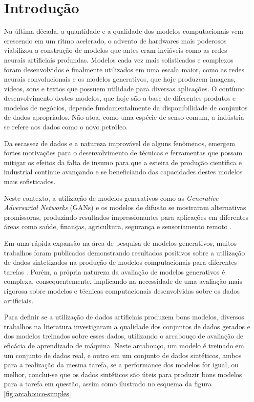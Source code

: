 \chapter{Introdução}
\label{capitulo:introducao}

Na última década, a quantidade e a qualidade dos modelos computacionais vem crescendo em um ritmo acelerado, o advento de hardwares mais poderosos viabilizou a construção de modelos que antes eram inviáveis como as redes neurais artificiais profundas.
Modelos cada vez mais sofisticados e complexos foram desenvolvidos e finalmente utilizados em uma escala maior, como as redes neurais convolucionais e os modelos generativos, que hoje produzem imagens, vídeos, sons e textos que possuem utilidade para diversas aplicações.
O contínuo desenvolvimento destes modelos, que hoje são a base de diferentes produtos e modelos de negócios, depende fundamentalmente da disponibilidade de conjuntos de dados apropriados. Não atoa, como uma espécie de senso comum, a indústria se refere aos dados como o novo petróleo.

Da escassez de dados e a natureza improvável de alguns fenômenos, emergem fortes motivações para o desenvolvimento de técnicas e ferramentas que possam mitigar os efeitos da falta de insumo para que a esteira de produção científica e industrial continue avançando e se beneficiando das capacidades destes modelos mais sofisticados.

Neste contexto, a utilização de modelos generativos como as \textit{Generative Adversarial Networks} (GANs) e os modelos de difusão se mostraram alternativas promissoras, produzindo resultados impressionantes para aplicações em diferentes áreas como saúde, finanças, agricultura, segurança e sensoriamento remoto \cite{iglesiasSurveyGANsComputer2023}.

Em uma rápida expansão na área de pesquisa de modelos generativos, muitos trabalhos foram publicados demonstrando resultados positivos sobre a utilização de dados sintetizados na produção de modelos computacionais para diferentes tarefas \cite{iglesiasSurveyGANsComputer2023}.
Porém, a própria natureza da avaliação de modelos generativos é complexa\cite{figueiraSurveySyntheticData2022}, consequentemente, implicando na necessidade de uma avaliação mais rigorosa sobre modelos e técnicas computacionais desenvolvidas sobre os dados artificiais.

Para definir se a utilização de dados artificiais produzem bons modelos, diversos trabalhos na literatura investigaram a qualidade dos conjuntos de dados gerados e dos modelos treinados sobre esses dados, utilizando o arcabouço de avaliação de eficácia de aprendizado de máquina. Neste arcabouço, um modelo é treinado em um conjunto de dados real, e outro em um conjunto de dados sintéticos, ambos para a realização da mesma tarefa, se a performance dos modelos for igual, ou melhor, conclui-se que os dados sintéticos são úteis para produzir bons modelos para a tarefa em questão, assim como ilustrado no esquema da figura \ref{fig:arcabouco-simples}.

